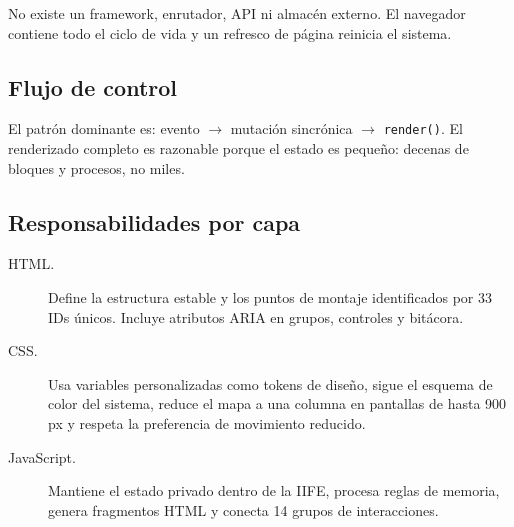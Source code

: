 \documentclass[11pt,a4paper]{article}
\newcommand{\funcion}[1]{\texttt{#1()}}
\begin{document}
No existe un framework, enrutador, API ni almacén externo. El navegador contiene
todo el ciclo de vida y un refresco de página reinicia el sistema.

\subsection{Flujo de control}

\begin{center}
\end{center}

El patrón dominante es: evento \(\rightarrow\) mutación sincrónica
\(\rightarrow\) \funcion{render}. El renderizado completo es razonable porque el
estado es pequeño: decenas de bloques y procesos, no miles.

\subsection{Responsabilidades por capa}

\begin{description}
  \item[HTML.] Define la estructura estable y los puntos de montaje identificados
  por 33 IDs únicos. Incluye atributos ARIA en grupos, controles y bitácora.
  \item[CSS.] Usa variables personalizadas como tokens de diseño, sigue el esquema
  de color del sistema, reduce el mapa a una columna en pantallas de hasta 900 px y
  respeta la preferencia de movimiento reducido.
  \item[JavaScript.] Mantiene el estado privado dentro de la IIFE, procesa reglas
  de memoria, genera fragmentos HTML y conecta 14 grupos de interacciones.
\end{description}
\end{document}
